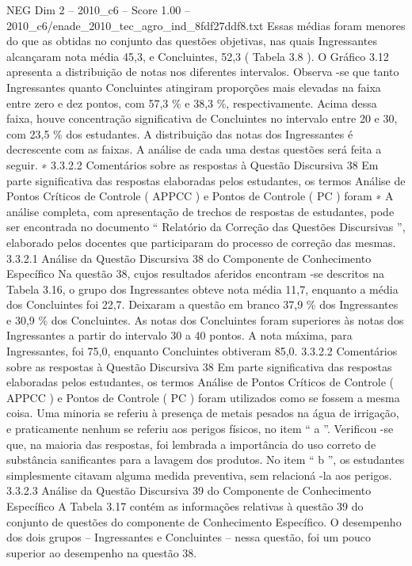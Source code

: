 \begin{textsample}{NEG Dim 2 – 2010\_c6 – Score 1.00 – 2010\_c6/enade\_2010\_tec\_agro\_ind\_8fdf27ddf8.txt}
Essas médias foram menores do que as obtidas no conjunto das questões objetivas, nas quais Ingressantes alcançaram nota média 45,3, e Concluintes, 52,3 ( Tabela 3.8 ).
O Gráfico 3.12 apresenta a distribuição de notas nos diferentes intervalos.
Observa -se que tanto Ingressantes quanto Concluintes atingiram proporções mais elevadas na faixa entre zero e dez pontos, com 57,3 \% e 38,3 \%, respectivamente.
Acima dessa faixa, houve concentração significativa de Concluintes no intervalo entre 20 e 30, com 23,5 \% dos estudantes.
A distribuição das notas dos Ingressantes é decrescente com as faixas.
A análise de cada uma destas questões será feita a seguir. ∗ 3.3.2.2 Comentários sobre as respostas à Questão Discursiva 38 Em parte significativa das respostas elaboradas pelos estudantes, os termos Análise de Pontos Críticos de Controle ( APPCC ) e Pontos de Controle ( PC ) foram ∗ A análise completa, com apresentação de trechos de respostas de estudantes, pode ser encontrada no documento “ Relatório da Correção das Questões Discursivas ”, elaborado pelos docentes que participaram do processo de correção das mesmas. 3.3.2.1 Análise da Questão Discursiva 38 do Componente de Conhecimento Específico Na questão 38, cujos resultados aferidos encontram -se descritos na Tabela 3.16, o grupo dos Ingressantes obteve nota média 11,7, enquanto a média dos Concluintes foi 22,7.
Deixaram a questão em branco 37,9 \% dos Ingressantes e 30,9 \% dos Concluintes.
As notas dos Concluintes foram superiores às notas dos Ingressantes a partir do intervalo 30 a 40 pontos.
A nota máxima, para Ingressantes, foi 75,0, enquanto Concluintes obtiveram 85,0. 3.3.2.2 Comentários sobre as respostas à Questão Discursiva 38 Em parte significativa das respostas elaboradas pelos estudantes, os termos Análise de Pontos Críticos de Controle ( APPCC ) e Pontos de Controle ( PC ) foram utilizados como se fossem a mesma coisa.
Uma minoria se referiu à presença de metais pesados na água de irrigação, e praticamente nenhum se referiu aos perigos físicos, no item “ a ”.
Verificou -se que, na maioria das respostas, foi lembrada a importância do uso correto de substância sanificantes para a lavagem dos produtos.
No item “ b ”, os estudantes simplesmente citavam alguma medida preventiva, sem relacioná -la aos perigos. 3.3.2.3 Análise da Questão Discursiva 39 do Componente de Conhecimento Específico A Tabela 3.17 contém as informações relativas à questão 39 do conjunto de questões do componente de Conhecimento Específico.
O desempenho dos dois grupos – Ingressantes e Concluintes – nessa questão, foi um pouco superior ao desempenho na questão 38.

\end{textsample}
